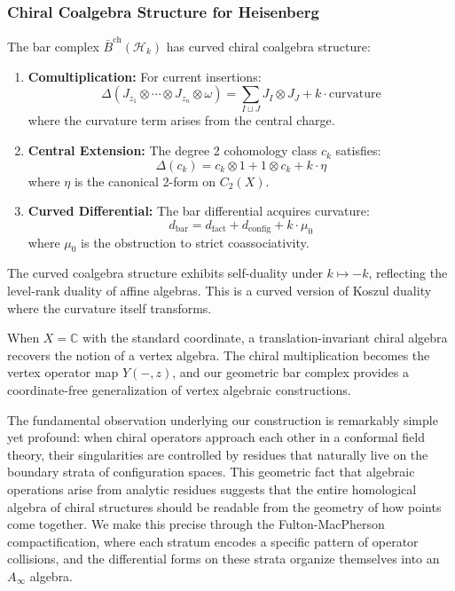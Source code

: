 \subsubsection{Chiral Coalgebra Structure for Heisenberg}

\begin{theorem}\label{thm:heis-bar-coalg}
The bar complex $\bar{B}^{\text{ch}}(\mathcal{H}_k)$ has curved chiral coalgebra structure:
\begin{enumerate}
\item \textbf{Comultiplication:} For current insertions:
\[
\Delta(J_{z_1} \otimes \cdots \otimes J_{z_n} \otimes \omega) = 
\sum_{I \sqcup J} J_I \otimes J_J + k \cdot \text{curvature}
\]
where the curvature term arises from the central charge.

\item \textbf{Central Extension:} The degree 2 cohomology class $c_k$ satisfies:
\[
\Delta(c_k) = c_k \otimes 1 + 1 \otimes c_k + k \cdot \eta
\]
where $\eta$ is the canonical 2-form on $C_2(X)$.

\item \textbf{Curved Differential:} The bar differential acquires curvature:
\[
 d_{\text{bar}} = d_{\text{fact}} + d_{\text{config}} + k \cdot \mu_0
\]
where $\mu_0$ is the obstruction to strict coassociativity.
\end{enumerate}
\end{theorem}

\begin{remark}
The curved coalgebra structure exhibits self-duality under $k \mapsto -k$, reflecting the 
level-rank duality of affine algebras. This is a curved version of Koszul duality where 
the curvature itself transforms.
\end{remark}

\begin{remark}
When $X = \mathbb{C}$ with the standard coordinate, a translation-invariant chiral algebra recovers the notion of a vertex algebra. The chiral multiplication becomes the vertex operator map $Y(-, z)$, and our geometric bar complex provides a coordinate-free generalization of vertex algebraic constructions.
\end{remark}

The fundamental observation underlying our construction is remarkably simple yet profound: when chiral operators approach each other in a conformal field theory, their singularities are controlled by residues that naturally live on the boundary strata of configuration spaces. This geometric fact that algebraic operations arise from analytic residues suggests that the entire homological algebra of chiral structures should be readable from the geometry of how points come together. We make this precise through the Fulton-MacPherson compactification, where each stratum encodes a specific pattern of operator collisions, and the differential forms on these strata organize themselves into an $A_\infty$ algebra.

